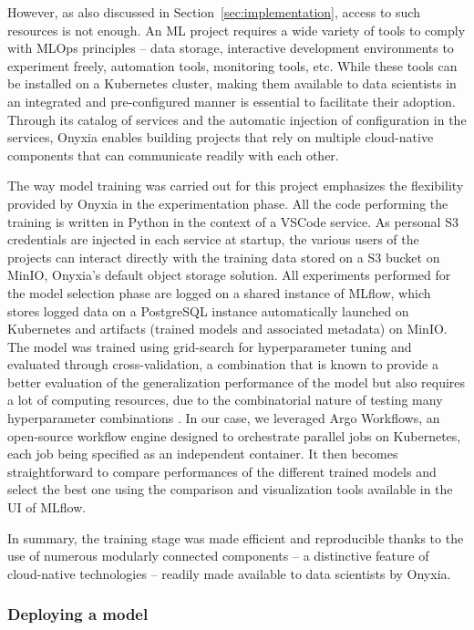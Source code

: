 \documentclass[graybox]{svmult}
\begin{document}
However, as also discussed in Section~\ref{sec:implementation}, access to such resources is not enough. An ML project requires a wide variety of tools to comply with MLOps principles -- data storage, interactive development environments to experiment freely, automation tools, monitoring tools, etc. While these tools can be installed on a Kubernetes cluster, making them available to data scientists in an integrated and pre-configured manner is essential to facilitate their adoption. Through its catalog of services and the automatic injection of configuration in the services, Onyxia enables building projects that rely on multiple cloud-native components that can communicate readily with each other.

The way model training was carried out for this project emphasizes the flexibility provided by Onyxia in the experimentation phase. All the code performing the training is written in Python in the context of a VSCode service. As personal S3 credentials are injected in each service at startup, the various users of the projects can interact directly with the training data stored on a S3 bucket on MinIO, Onyxia's default object storage solution. All experiments performed for the model selection phase are logged on a shared instance of MLflow, which stores logged data on a PostgreSQL instance automatically launched on Kubernetes and artifacts (trained models and associated metadata) on MinIO. The model was trained using grid-search for hyperparameter tuning and evaluated through cross-validation, a combination that is known to provide a better evaluation of the generalization performance of the model but also requires a lot of computing resources, due to the combinatorial nature of testing many hyperparameter combinations \citep{bischl2023hyperparameter}. In our case, we leveraged Argo Workflows, an open-source workflow engine designed to orchestrate parallel jobs on Kubernetes, each job being specified as an independent container. It then becomes straightforward to compare performances of the different trained models and select the best one using the comparison and visualization tools available in the UI of MLflow. 

In summary, the training stage was made efficient and reproducible thanks to the use of numerous modularly connected components -- a distinctive feature of cloud-native technologies -- readily made available to data scientists by Onyxia.

\subsubsection{Deploying a model}
\end{document}
